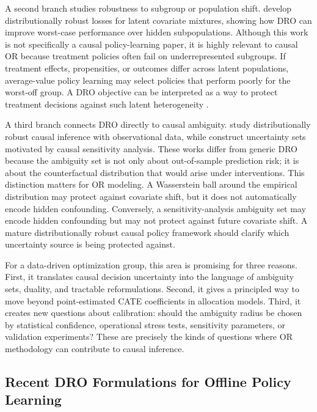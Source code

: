 \documentclass[11pt]{article}
\begin{document}
A second branch studies robustness to subgroup or population shift. \citet{duchi2023latent} develop distributionally robust losses for latent covariate mixtures, showing how DRO can improve worst-case performance over hidden subpopulations. Although this work is not specifically a causal policy-learning paper, it is highly relevant to causal OR because treatment policies often fail on underrepresented subgroups. If treatment effects, propensities, or outcomes differ across latent populations, average-value policy learning may select policies that perform poorly for the worst-off group. A DRO objective can be interpreted as a way to protect treatment decisions against such latent heterogeneity \citep{duchi2023latent}.

A third branch connects DRO directly to causal ambiguity. \citet{duchi2023drocausal} study distributionally robust causal inference with observational data, while \citet{kallus2018confounding} construct uncertainty sets motivated by causal sensitivity analysis. These works differ from generic DRO because the ambiguity set is not only about out-of-sample prediction risk; it is about the counterfactual distribution that would arise under interventions. This distinction matters for OR modeling. A Wasserstein ball around the empirical distribution may protect against covariate shift, but it does not automatically encode hidden confounding. Conversely, a sensitivity-analysis ambiguity set may encode hidden confounding but may not protect against future covariate shift. A mature distributionally robust causal policy framework should clarify which uncertainty source is being protected against.

For a data-driven optimization group, this area is promising for three reasons. First, it translates causal decision uncertainty into the language of ambiguity sets, duality, and tractable reformulations. Second, it gives a principled way to move beyond point-estimated CATE coefficients in allocation models. Third, it creates new questions about calibration: should the ambiguity radius be chosen by statistical confidence, operational stress tests, sensitivity parameters, or validation experiments? These are precisely the kinds of questions where OR methodology can contribute to causal inference.

\subsection{Recent DRO Formulations for Offline Policy Learning}
\end{document}
